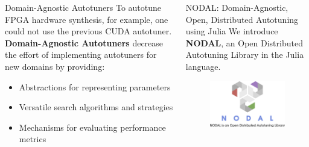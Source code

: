 \documentclass{beamer}
\begin{document}
\begin{frame}[fragile]
\begin{columns}[t]
\begin{column}{.48\linewidth}
        \begin{block}{\Large Domain-Agnostic Autotuners}
            \justifying
            \large
            To autotune FPGA hardware synthesis, for example,
            one could not use the previous CUDA autotuner.
            \textbf{Domain-Agnostic Autotuners} decrease the effort of
            implementing autotuners for new domains by providing:

            \vspace{1cm}

            \begin{itemize}
                \item Abstractions for representing parameters
                \item Versatile search algorithms and strategies
                \item Mechanisms for evaluating performance metrics
            \end{itemize}
        \end{block}
    \end{column}
    \begin{column}{.48\linewidth}
        \begin{block}{\Large NODAL: Domain-Agnostic, Open, Distributed
            Autotuning using Julia}
            \justifying
            \large
            We introduce \textbf{NODAL}, an Open Distributed Autotuning Library
            in the Julia language.
            \vspace{2cm}
            \begin{figure}[htpb]
                \includegraphics[width=0.9\linewidth]{logo}
            \end{figure}
            \vspace{2cm}


\end{block}
\end{column}
\end{columns}
\end{frame}
\end{document}
